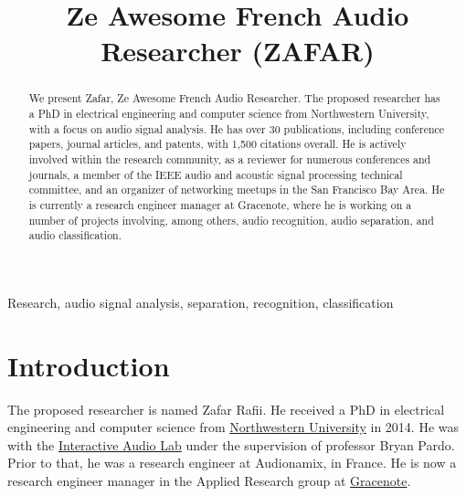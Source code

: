\documentclass{article}
\title{Ze Awesome French Audio Researcher (ZAFAR)}
\begin{document}
\maketitle

\begin{abstract}
We present Zafar, Ze Awesome French Audio Researcher. The proposed researcher has a PhD in electrical engineering and computer science from Northwestern University, with a focus on audio signal analysis. He has over 30 publications, including conference papers, journal articles, and patents, with 1,500 citations overall. He is actively involved within the research community, as a reviewer for numerous conferences and journals, a member of the IEEE audio and acoustic signal processing technical committee, and an organizer of networking meetups in the San Francisco Bay Area. He is currently a research engineer manager at Gracenote, where he is working on a number of projects involving, among others, audio recognition, audio separation, and audio classification.
\end{abstract}

\begin{keywords}
Research, audio signal analysis, separation, recognition, classification
\end{keywords}

\section{Introduction}
\label{sec:intro}

\nocite{patent_cremer_may2021}
\nocite{patent_rafii_may2021}
\nocite{patent_cremer_feb2021}
\nocite{patent_rafii_jan2021}
\nocite{patent_rafii_dec2020}
\nocite{patent_rafii_oct20202}
\nocite{patent_rafii_oct2020}
\nocite{patent_rafii_jul20202}
\nocite{patent_rafii_jul2020}
\nocite{patent_coover_mar2020}
\nocite{patent_pardo_jul2015}

\cite{article_rafii_nov2018}

The proposed researcher is named Zafar Rafii. He received a PhD in electrical engineering and computer science from \href{https://www.northwestern.edu/}{Northwestern University} in 2014. He was with the \href{https://interactiveaudiolab.github.io/}{Interactive Audio Lab} under the supervision of professor Bryan Pardo. Prior to that, he was a research engineer at Audionamix, in France. He is now a research engineer manager in the Applied Research group at \href{https://www.gracenote.com/}{Gracenote}.
\end{document}
